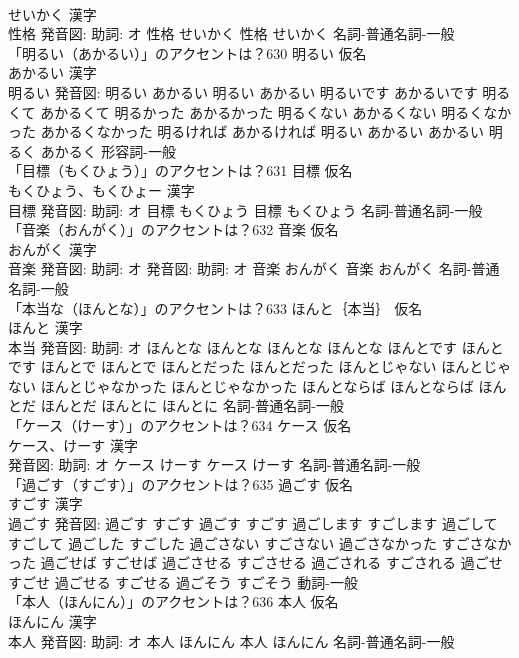 \documentclass[8pt]{extreport}
\begin{document}
\begin{CJK}{UTF8}{min}
\\	せいかく 漢字　
\\	性格 発音図: 助詞: オ	性格 せいかく		性格 せいかく				名詞-普通名詞-一般 
\\	「明るい（あかるい）」のアクセントは？630	明るい 仮名　
\\	あかるい 漢字　
\\	明るい 発音図:	明るい あかるい		明るい あかるい 明るいです あかるいです 明るくて あかるくて 明るかった あかるかった 明るくない あかるくない 明るくなかった あかるくなかった 明るければ あかるければ 明るい あかるい あかるい 明るく あかるく				形容詞-一般 
\\	「目標（もくひょう）」のアクセントは？631	目標 仮名　
\\	もくひょう、もくひょー 漢字　
\\	目標 発音図: 助詞: オ	目標 もくひょう		目標 もくひょう				名詞-普通名詞-一般 
\\	「音楽（おんがく）」のアクセントは？632	音楽 仮名　
\\	おんがく 漢字　
\\	音楽 発音図: 助詞: オ 発音図: 助詞: オ	音楽 おんがく		音楽 おんがく				名詞-普通名詞-一般 
\\	「本当な（ほんとな）」のアクセントは？633	ほんと｛本当｝ 仮名　
\\	ほんと 漢字　
\\	本当 発音図: 助詞: オ	ほんとな ほんとな		ほんとな ほんとな ほんとです ほんとです ほんとで ほんとで ほんとだった ほんとだった ほんとじゃない ほんとじゃない ほんとじゃなかった ほんとじゃなかった ほんとならば ほんとならば ほんとだ ほんとだ ほんとに ほんとに				名詞-普通名詞-一般 
\\	「ケース（けーす）」のアクセントは？634	ケース 仮名　
\\	ケース、けーす 漢字　
\\	発音図: 助詞: オ	ケース けーす		ケース けーす				名詞-普通名詞-一般 
\\	「過ごす（すごす）」のアクセントは？635	過ごす 仮名　
\\	すごす 漢字　
\\	過ごす 発音図:	過ごす すごす		過ごす すごす 過ごします すごします 過ごして すごして 過ごした すごした 過ごさない すごさない 過ごさなかった すごさなかった 過ごせば すごせば 過ごさせる すごさせる 過ごされる すごされる 過ごせ すごせ 過ごせる すごせる 過ごそう すごそう				動詞-一般 
\\	「本人（ほんにん）」のアクセントは？636	本人 仮名　
\\	ほんにん 漢字　
\\	本人 発音図: 助詞: オ	本人 ほんにん		本人 ほんにん				名詞-普通名詞-一般 

\end{CJK}
\end{document}
